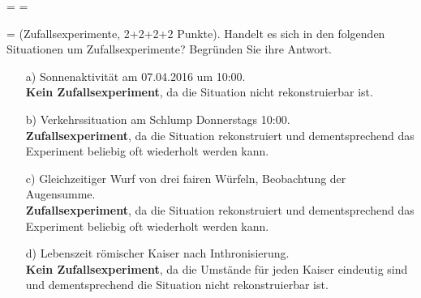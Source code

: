 \documentclass[twoside]{article}
\begin{document}
\ifnum\Empty=\True
\leereSeite
\fi
\ifnum\TOC=\True
\pagestyle{empty}
\tableofcontents
\newpage
\fi
\pagestyle{fancy}

\ifnum\ZettelEins=\True
{}
%
%
(Zufallsexperimente, 2+2+2+2 Punkte).
Handelt es sich in den folgenden Situationen um Zufallsexperimente?
Begründen Sie ihre Antwort.
\begin{enumerate}
	\item[a)] Sonnenaktivität am 07.04.2016 um 10:00.\\
	\textbf{Kein Zufallsexperiment}, da die Situation nicht rekonstruierbar ist.
	
	\item[b)] Verkehrssituation am Schlump Donnerstags 10:00.\\
	\textbf{Zufallsexperiment}, da die Situation rekonstruiert und dementsprechend das Experiment beliebig oft wiederholt werden kann.
	
	\item[c)] Gleichzeitiger Wurf von drei fairen Würfeln, Beobachtung der Augensumme.\\
	\textbf{Zufallsexperiment}, da die Situation rekonstruiert und dementsprechend das Experiment beliebig oft wiederholt werden kann.
	
	\item[d)] Lebenszeit römischer Kaiser nach Inthronisierung.\\
	\textbf{Kein Zufallsexperiment}, da die Umstände für jeden Kaiser eindeutig sind und dementsprechend die Situation nicht rekonstruierbar ist.
	
	
\end{enumerate}
\end{document}

